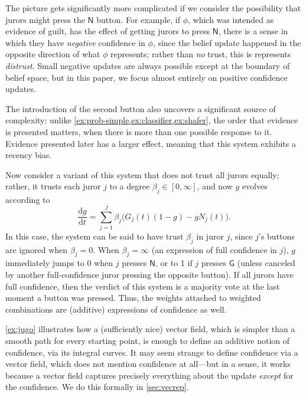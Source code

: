 \begin{subappendices}
\begin{example}
    The picture gets significantly more complicated if we consider the possibility
    that jurors might press the $\mathsf N$ button. For example, if $\phi$, which was intended
    as evidence of guilt, has the effect of getting jurors to press $\mathsf N$, there is a sense
    in which they have \emph{negative} confidence in $\phi$, since the belief update happened in the opposite direction of what $\phi$ represents; rather than \emph{no} trust, this is represents \emph{distrust}. 
    Small negative updates are always possible except at the boundary of belief space, but in this paper, we focus almost entirely on positive confidence updates.

    The introduction of the second button also uncovers a significant source of complexity:
    unlike \cref{ex:prob-simple,ex:classifier,ex:shafer}, 
    the order that evidence is presented matters, when there is more than one possible response to it.
    Evidence presented later has a larger effect,
    meaning that this system exhibits a recency bias.

    Now consider a variant of this system that does
    not trust all jurors equally; rather, it trusts each juror $j$
    to a degree $\beta_j \in [0, \infty]$, and now $g$ evolves
    according to
    \[
    	\frac{\mathrm dg}{\mathrm dt} = 
    	\sum_{j = 1}^J \beta_j \Big( G_j(t) (1-g) 
    		- g N_j(t) \Big).
    \]
    In this case, the system can be said to have trust $\beta_j$ in juror
    $j$, since $j$'s buttons are ignored when $\beta_j = 0$. 
    When $\beta_j = \infty$ (an expression of full confidence in $j$),
    $g$ immediately jumps to 0 when $j$ presses 
    $\mathsf N$, or to 1 if $j$ presses $\mathsf G$ (unless canceled by
    another full-confidence juror pressing the opposite button).
    If all jurors have full confidence, then the verdict of this system is
    a majority vote at the last moment a button was pressed. 
    Thus, the weights attached to weighted combinations are (additive) expressions 
    of confidence as well. 
    \end{example}

    \cref{ex:jugo} illustrates how a (sufficiently nice) vector field, 
    	which is simpler than a smooth path for every starting point, is enough to define
    an additive notion of confidence, via its integral curves.
    It may seem strange to define confidence via a vector field, which does not mention confidence at all---but in a sense, it works because a vector field captures precisely everything about the update \emph{except} for the confidence. We do this formally in \cref{sec:vecrep}. 




\end{subappendices}
